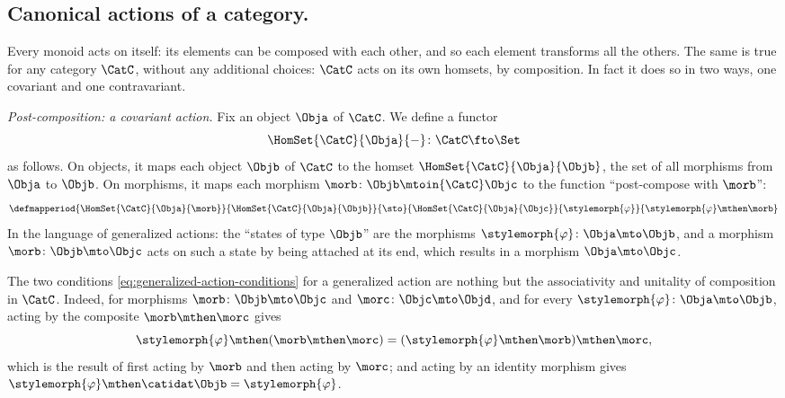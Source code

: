 \subsection{Canonical actions of a category.}
Every monoid acts on itself: its elements can be composed with each other, and so each element transforms all the others.
The same is true for any category $\CatC$, without any additional choices: $\CatC$ acts on its own homsets, by composition.
In fact it does so in two ways, one covariant and one contravariant.

\emph{Post-composition: a covariant action.}
Fix an object $\Obja$ of $\CatC$.
We define a functor
\begin{equation}
    \label{eq:covariant-hom-functor-type}
    \HomSet{\CatC}{\Obja}{-} \colon \CatC \fto \Set
\end{equation}
as follows.
On objects, it maps each object $\Objb$ of $\CatC$ to the homset $\HomSet{\CatC}{\Obja}{\Objb}$, the set of all morphisms from $\Obja$ to $\Objb$.
On morphisms, it maps each morphism $\morb \colon \Objb \mtoin{\CatC} \Objc$ to the function ``post-compose with $\morb$'':
\begin{equation}
    \label{eq:covariant-hom-functor-on-morphisms}
    \defmapperiod{\HomSet{\CatC}{\Obja}{\morb}}{\HomSet{\CatC}{\Obja}{\Objb}}{\sto}{\HomSet{\CatC}{\Obja}{\Objc}}{\stylemorph{\varphi}}{\stylemorph{\varphi} \mthen \morb}
\end{equation}
In the language of generalized actions: the ``states of type $\Objb$'' are the morphisms $\stylemorph{\varphi} \colon \Obja \mto \Objb$, and a morphism $\morb \colon \Objb \mto \Objc$ acts on such a state by being attached at its end, which results in a morphism $\Obja \mto \Objc$.

The two conditions \cref{eq:generalized-action-conditions} for a generalized action are nothing but the associativity and unitality of composition in $\CatC$.
Indeed, for morphisms $\morb \colon \Objb \mto \Objc$ and $\morc \colon \Objc \mto \Objd$, and for every $\stylemorph{\varphi} \colon \Obja \mto \Objb$, acting by the composite $\morb \mthen \morc$ gives
\begin{equation}
    \stylemorph{\varphi} \mthen (\morb \mthen \morc) = (\stylemorph{\varphi} \mthen \morb) \mthen \morc,
\end{equation}
which is the result of first acting by $\morb$ and then acting by $\morc$; and acting by an identity morphism gives $\stylemorph{\varphi} \mthen \catidat\Objb = \stylemorph{\varphi}$.


